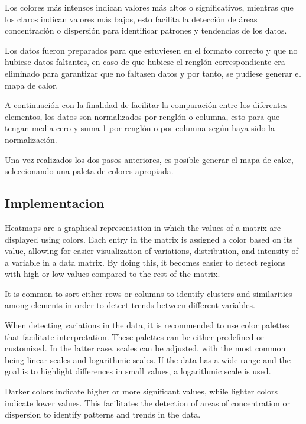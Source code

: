 \documentclass{article}
\begin{document}
Los colores más intensos indican valores más altos o significativos, mientras que los claros indican valores más bajos, esto facilita la detección de áreas  concentración o dispersión para identificar patrones y tendencias de los datos.



Los datos fueron preparados para que estuviesen en el formato correcto y que no hubiese datos faltantes, en caso de que hubiese el renglón correspondiente era eliminado para garantizar que no faltasen datos y por tanto, se pudiese generar el mapa de calor.


A continuación con la finalidad de facilitar la comparación entre los diferentes elementos, los datos son normalizados por renglón o columna, esto para que tengan media cero y suma 1 por renglón o por columna según haya sido la normalización.

Una vez realizados los dos pasos anteriores, es posible generar el mapa de calor, seleccionando una paleta de colores apropiada.




\subsection{Implementacion}

Heatmaps are a graphical representation in which the values of a matrix are displayed using colors. Each entry in the matrix is assigned a color based on its value, allowing for easier visualization of variations, distribution, and intensity of a variable in a data matrix. By doing this, it becomes easier to detect regions with high or low values compared to the rest of the matrix.

It is common to sort either rows or columns to identify clusters and similarities among elements in order to detect trends between different variables.

When detecting variations in the data, it is recommended to use color palettes that facilitate interpretation. These palettes can be either predefined or customized. In the latter case, scales can be adjusted, with the most common being linear scales and logarithmic scales. If the data has a wide range and the goal is to highlight differences in small values, a logarithmic scale is used.

Darker colors indicate higher or more significant values, while lighter colors indicate lower values. This facilitates the detection of areas of concentration or dispersion to identify patterns and trends in the data.
\end{document}
